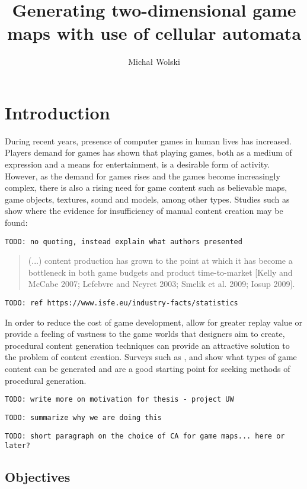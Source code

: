\documentclass[12pt]{report}
\title{Generating two-dimensional game maps with use of cellular automata}
\author{Michał Wolski}
\newcommand{\todo}[1]{}
\renewcommand{\todo}[1]{{\color{red} \par \noindent \footnotesize \texttt{TODO: {#1} }}}
\begin{document}
 
\maketitle
\tableofcontents	%

\chapter{Introduction} \label{rozdzial.wstep} 
 
During recent years, presence of computer games in human lives has increased. Players demand for games has shown that playing games, both as a medium of expression and a means for entertainment, is a desirable form of activity. However, as the demand for games rises and the games become increasingly complex, there is also a rising need for game content such as believable maps, game objects, textures, sound and models, among other types. Studies such as \autocite{hendrikx2013procedural} show where the evidence for insufficiency of manual content creation may be found:

\todo{no quoting, instead explain what authors presented}

\begin{quotation}
	(...) content production has grown to the point at which it has become a bottleneck in both game budgets and product time-to-market [Kelly and McCabe 2007; Lefebvre and	Neyret 2003; Smelik et al. 2009; Iosup 2009].
\end{quotation}

\todo{ref https://www.isfe.eu/industry-facts/statistics}

In order to reduce the cost of game development, allow for greater replay value or provide a feeling of vastness to the game worlds that designers aim to create, procedural content generation techniques can provide an attractive solution to the problem of content creation. Surveys such as \autocite{hendrikx2013procedural}, \autocite{togelius2011search} and \autocite{de2011survey} show what types of game content can be generated and are a good starting point for seeking methods of procedural generation.


\todo{write more on motivation for thesis - project UW}
\todo{summarize why we are doing this}
\todo{short paragraph on the choice of CA for game maps... here or later?}


\section{Objectives}
\end{document}
